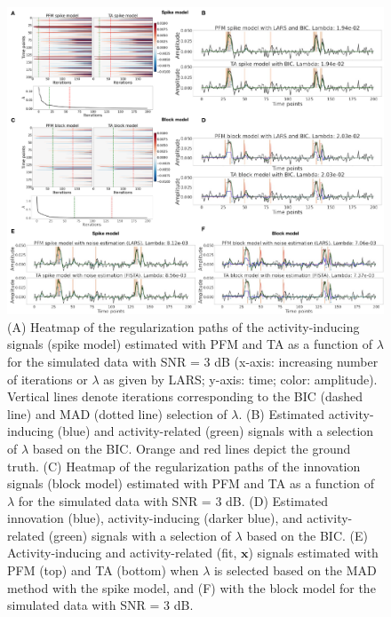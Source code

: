 \begin{figure}[t!]
    \begin{center}
        \includegraphics[width=\textwidth]{figures/synthesis_analysis/figure_sim.pdf}
    \end{center}
    \caption{(A) Heatmap of the regularization paths of the activity-inducing
    signals (spike model) estimated with PFM and TA as a function of $\lambda$
    for the simulated data with SNR = 3 dB (x-axis: increasing number of
    iterations or $\lambda$ as given by LARS; y-axis: time; color: amplitude).
    Vertical lines denote iterations corresponding to the BIC (dashed line) and
    MAD (dotted line) selection of $\lambda$. (B) Estimated activity-inducing
    (blue) and activity-related (green) signals with a selection of $\lambda$
    based on the BIC. Orange and red lines depict the ground truth. (C) Heatmap
    of the regularization paths of the innovation signals (block model)
    estimated with PFM and TA as a function of $\lambda$ for the simulated data
    with SNR = 3 dB. (D) Estimated innovation (blue), activity-inducing (darker
    blue), and activity-related (green) signals with a selection of $\lambda$
    based on the BIC. (E) Activity-inducing and activity-related (fit,
    $\mathbf{x}$) signals estimated with PFM (top) and TA (bottom) when
    $\lambda$ is selected based on the MAD method with the spike model, and (F)
    with the block model for the simulated data with SNR = 3 dB.}
\label{fig:sim}
\end{figure}

